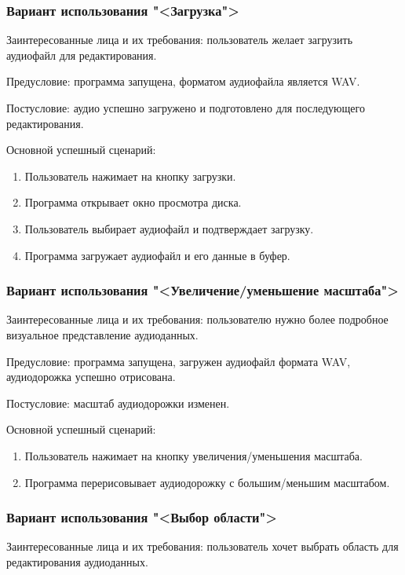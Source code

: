 \subsubsection{Вариант использования "<Загрузка">}

Заинтересованные лица и их требования: пользователь желает загрузить аудиофайл для редактирования.

Предусловие: программа запущена, форматом аудиофайла является WAV.

Постусловие: аудио успешно загружено и подготовлено для последующего редактирования.

Основной успешный сценарий:
\begin{enumerate}
	\item Пользователь нажимает на кнопку загрузки.
	\item Программа открывает окно просмотра диска.
	\item Пользователь выбирает аудиофайл и подтверждает загрузку.
	\item Программа загружает аудиофайл и его данные в буфер.
\end{enumerate} 

\subsubsection{Вариант использования "<Увеличение/уменьшение масштаба">}

Заинтересованные лица и их требования: пользователю нужно более подробное визуальное представление аудиоданных.

Предусловие: программа запущена, загружен аудиофайл формата WAV, аудиодорожка успешно отрисована.

Постусловие: масштаб аудиодорожки изменен.

Основной успешный сценарий:
\begin{enumerate}
	\item Пользователь нажимает на кнопку увеличения/уменьшения масштаба.
	\item Программа перерисовывает аудиодорожку с большим/меньшим масштабом.
\end{enumerate} 

\subsubsection{Вариант использования "<Выбор области">}

Заинтересованные лица и их требования: пользователь хочет выбрать область для редактирования аудиоданных.

